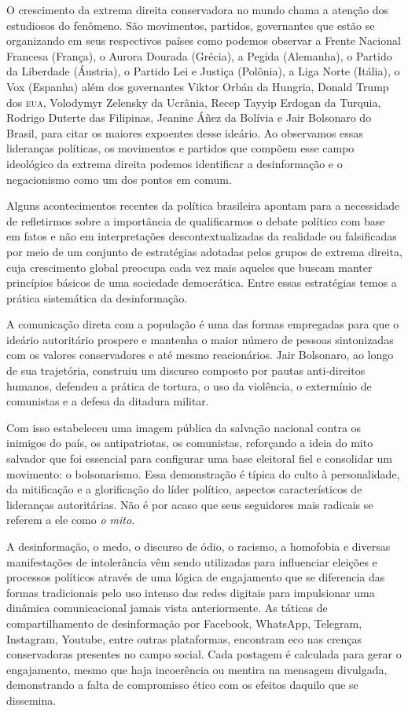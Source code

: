 O crescimento da extrema direita conservadora no mundo chama a atenção
dos estudiosos do fenômeno. São movimentos, partidos, governantes que
estão se organizando em seus respectivos países como podemos observar a
Frente Nacional Francesa (França), o Aurora Dourada (Grécia), a Pegida
(Alemanha), o Partido da Liberdade (Áustria), o Partido Lei e Justiça
(Polônia), a Liga Norte (Itália), o Vox (Espanha) além dos governantes
Viktor Orbán da Hungria, Donald Trump dos \textsc{eua},
Volodymyr Zelensky da Ucrânia, Recep Tayyip Erdogan da Turquia, Rodrigo Duterte
das Filipinas, Jeanine Áñez da Bolívia e Jair
Bolsonaro do Brasil, para citar os maiores expoentes desse ideário. Ao
observamos essas lideranças políticas, os movimentos e partidos que
compõem esse campo ideológico da extrema direita podemos identificar a
desinformação e o negacionismo como um dos pontos em comum.

Alguns acontecimentos recentes da política brasileira apontam para a
necessidade de refletirmos sobre a importância de qualificarmos o debate
político com base em fatos e não em interpretações descontextualizadas
da realidade ou falsificadas por meio de um conjunto de estratégias
adotadas pelos grupos de extrema direita, cuja crescimento global
preocupa cada vez mais aqueles que buscam manter princípios básicos de
uma sociedade democrática. Entre essas estratégias temos a prática
sistemática da desinformação.

A comunicação direta com a população é uma das formas empregadas para
que o ideário autoritário prospere e mantenha o maior número de pessoas
sintonizadas com os valores conservadores e até mesmo reacionários. Jair
Bolsonaro, ao longo de sua trajetória, construiu um discurso composto
por pautas anti-direitos humanos, defendeu a prática de tortura, o uso
da violência, o extermínio de comunistas e a defesa da ditadura militar.

Com isso estabeleceu uma imagem pública da salvação nacional contra os
inimigos do país, os antipatriotas, os comunistas, reforçando a ideia do
mito salvador que foi essencial para configurar uma base eleitoral fiel
e consolidar um movimento: o bolsonarismo. Essa demonstração é típica do
culto à personalidade, da mitificação e a glorificação do líder
político, aspectos característicos de lideranças autoritárias. Não é por
acaso que seus seguidores mais radicais se referem a ele como \textit{o
mito}.

A desinformação, o medo, o discurso de ódio, o racismo, a homofobia e
diversas manifestações de intolerância vêm sendo utilizadas para
influenciar eleições e processos políticos através de uma lógica de
engajamento que se diferencia das formas tradicionais pelo uso intenso
das redes digitais para impulsionar uma dinâmica comunicacional jamais
vista anteriormente. As táticas de compartilhamento de desinformação por
Facebook, WhatsApp, Telegram, Instagram, Youtube, entre outras
plataformas, encontram eco nas crenças conservadoras presentes no campo
social. Cada postagem é calculada para gerar o engajamento, mesmo que
haja incoerência ou mentira na mensagem divulgada, demonstrando a falta
de compromisso ético com os efeitos daquilo que se dissemina.

